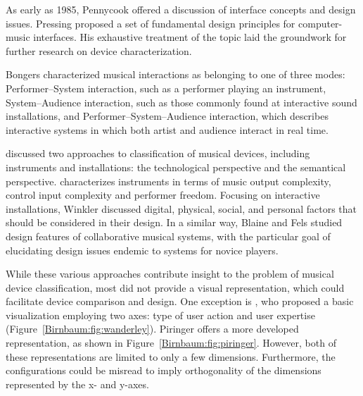 As early as 1985, Pennycook \cite{Pennycook:1985} offered a discussion of interface concepts and design issues. Pressing \cite{Pressing:1990} proposed a set of fundamental design principles for computer-music interfaces. His exhaustive treatment of the topic laid the groundwork for further research on device characterization.

Bongers \cite{Bongers:2000} characterized musical interactions as belonging to one of three modes: Performer--System interaction, such as a performer playing an instrument, System--Audience interaction, such as those commonly found at interactive sound installations, and Performer--System--Audience interaction, which describes interactive systems in which both artist and audience interact in real time.

 \cite{Wanderley:2000} discussed two approaches to classification of musical devices, including instruments and installations: the technological perspective and the semantical perspective. \cite{Ulyate:2001} characterizes instruments in terms of music output complexity, control input complexity and performer freedom. Focusing on interactive installations, Winkler \cite{Winkler:2000} discussed digital, physical, social, and personal factors that should be considered in their design. In a similar way, Blaine and Fels \cite{Blaine:2003a} studied design features of collaborative musical systems, with the particular goal of elucidating design issues endemic to systems for novice players.

While these various approaches contribute insight to the problem of musical device classification, most did not provide a visual representation, which could facilitate device comparison and design. One exception is \cite{Wanderley:2000}, who proposed a basic visualization employing two axes: type of user action and user expertise (Figure~\ref{Birnbaum:fig:wanderley}). Piringer \cite{Piringer:2001} offers a more developed representation, as shown in Figure~\ref{Birnbaum:fig:piringer}. However, both of these representations are limited to only a few dimensions. Furthermore, the configurations could be misread to imply orthogonality of the dimensions represented by the x- and y-axes.

